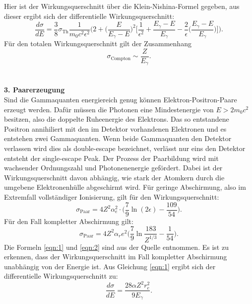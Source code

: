 Hier ist der Wirkungsquerschnitt über die Klein-Nishina-Formel gegeben, aus dieser ergibt sich der
differentielle Wirkungsquerschnitt:
\begin{equation}
  \frac{d\sigma}{dE}=\frac{3}{8}\sigma_{\text{Th}}\frac{1}{m_0 c^2 \epsilon^2}\bigg(2+\bigg(\frac{E}{E_\gamma-E} \bigg)^2 \bigg[\frac{1}{\epsilon^2}+
  \frac{E_\gamma-E}{E_\gamma}-\frac{2}{\epsilon}\bigg(\frac{E_\gamma-E}{E_\gamma}\bigg) \bigg]\bigg).
  \label{eqn:diffCompton}
\end{equation}
Für den totalen Wirkungsquerschnitt gilt der Zusammenhang
\begin{equation}
  \sigma_{\text{Compton}}\sim \frac{Z}{E_{\gamma}}.
  \label{eqn:WPCompton}
\end{equation}
\\
\\
\textbf{3. Paarerzeugung}\\
Sind die Gammaquanten energiereich genug können Elektron-Positron-Paare erzeugt werden. Dafür müssen
die Photonen eine Mindestenergie von $E>2 m_0 c^2$ besitzen, also die doppelte
Ruheenergie des Elektrons.
Das so entstandene Positron annihiliert mit den im Detektor vorhandenen Elektronen und es
entstehen zwei Gammaquanten. Wenn beide Gammaquanten den Detektor verlassen wird dies als double-escape
bezeichnet, verlässt nur eins den Detektor entsteht der single-escape Peak.
Der Prozess der Paarbildung wird mit wachsender Ordnungszahl und Photonenenergie gefördert.
Dabei ist der Wirkungsquerschnitt davon abhängig, wie stark der Atomkern durch die
umgebene Elektronenhülle abgeschirmt wird. Für geringe Abschirmung, also im Extremfall vollständiger
Ionisierung, gilt für den Wirkungsquerschnitt:
\begin{equation}
  \sigma_{\text{Paar}}= 4Z^2\alpha_{e}^2\cdot\bigg(\frac{7}{9}\ln(2\epsilon)-\frac{109}{54}\bigg).
  \label{eqn:1}
\end{equation}
Für den Fall kompletter Abschirmung gilt:
\begin{equation}
  \sigma_{\text{Paar}}=4Z^2\alpha_r{e}^2\bigg(\frac{7}{9}\ln{\frac{183}{Z^{1/3}}}-\frac{1}{54}\bigg).
  \label{eqn:2}
\end{equation}
Die Formeln \ref{eqn:1} und \ref{eqn:2} sind aus der Quelle \cite{Karlsruhe} entnommen.
Es ist zu erkennen, dass der Wirkungsquerschnitt im Fall kompletter Abschirmung unabhängig von der Energie ist.
Aus Gleichung \ref{eqn:1} ergibt sich der differentielle Wirkungsquerschnitt zu:
\begin{equation}
  \frac{d\sigma}{dE}= \frac{28\alpha Z^2 r_{e}^2}{9E_{\gamma}}.
  \label{eqn:diffPaar}
\end{equation}


